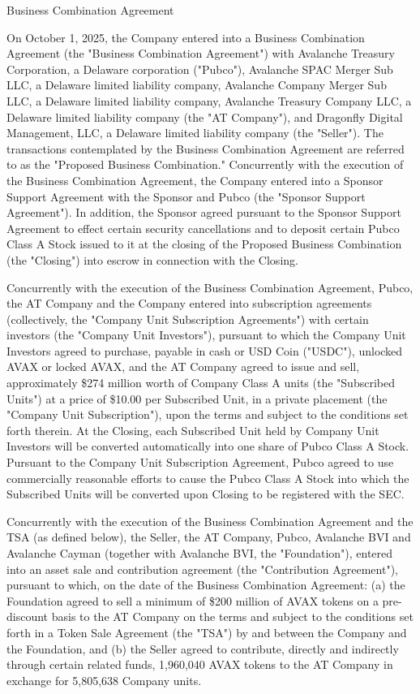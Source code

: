 \documentclass[11pt,a4paper]{article}
\begin{document}
Business Combination Agreement

On October 1, 2025, the Company entered into a Business Combination Agreement (the "Business Combination Agreement") with Avalanche Treasury Corporation, a Delaware corporation ("Pubco"), Avalanche SPAC Merger Sub LLC, a Delaware limited liability company, Avalanche Company Merger Sub LLC, a Delaware limited liability company, Avalanche Treasury Company LLC, a Delaware limited liability company (the "AT Company"), and Dragonfly Digital Management, LLC, a Delaware limited liability company (the "Seller"). The transactions contemplated by the Business Combination Agreement are referred to as the "Proposed Business Combination." Concurrently with the execution of the Business Combination Agreement, the Company entered into a Sponsor Support Agreement with the Sponsor and Pubco (the "Sponsor Support Agreement"). In addition, the Sponsor agreed pursuant to the Sponsor Support Agreement to effect certain security cancellations and to deposit certain Pubco Class A Stock issued to it at the closing of the Proposed Business Combination (the "Closing") into escrow in connection with the Closing.

Concurrently with the execution of the Business Combination Agreement, Pubco, the AT Company and the Company entered into subscription agreements (collectively, the "Company Unit Subscription Agreements") with certain investors (the "Company Unit Investors"), pursuant to which the Company Unit Investors agreed to purchase, payable in cash or USD Coin ("USDC"), unlocked AVAX or locked AVAX, and the AT Company agreed to issue and sell, approximately \$274 million worth of Company Class A units (the "Subscribed Units") at a price of \$10.00 per Subscribed Unit, in a private placement (the "Company Unit Subscription"), upon the terms and subject to the conditions set forth therein. At the Closing, each Subscribed Unit held by Company Unit Investors will be converted automatically into one share of Pubco Class A Stock. Pursuant to the Company Unit Subscription Agreement, Pubco agreed to use commercially reasonable efforts to cause the Pubco Class A Stock into which the Subscribed Units will be converted upon Closing to be registered with the SEC.

Concurrently with the execution of the Business Combination Agreement and the TSA (as defined below), the Seller, the AT Company, Pubco, Avalanche BVI and Avalanche Cayman (together with Avalanche BVI, the "Foundation"), entered into an asset sale and contribution agreement (the "Contribution Agreement"), pursuant to which, on the date of the Business Combination Agreement: (a) the Foundation agreed to sell a minimum of \$200 million of AVAX tokens on a pre-discount basis to the AT Company on the terms and subject to the conditions set forth in a Token Sale Agreement (the "TSA") by and between the Company and the Foundation, and (b) the Seller agreed to contribute, directly and indirectly through certain related funds, 1,960,040 AVAX tokens to the AT Company in exchange for 5,805,638 Company units.
\end{document}

